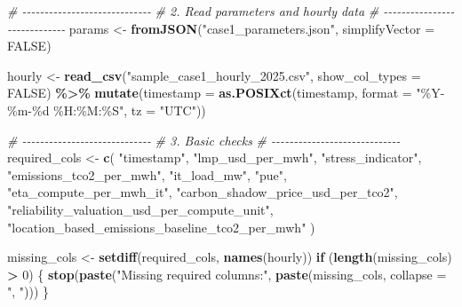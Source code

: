 \documentclass[
]{article}
\newenvironment{Shaded}{\begin{snugshade}}{\end{snugshade}}
\newcommand{\AttributeTok}[1]{\textcolor[rgb]{0.13,0.29,0.53}{#1}}
\newcommand{\CommentTok}[1]{\textcolor[rgb]{0.56,0.35,0.01}{\textit{#1}}}
\newcommand{\ConstantTok}[1]{\textcolor[rgb]{0.56,0.35,0.01}{#1}}
\newcommand{\ControlFlowTok}[1]{\textcolor[rgb]{0.13,0.29,0.53}{\textbf{#1}}}
\newcommand{\DecValTok}[1]{\textcolor[rgb]{0.00,0.00,0.81}{#1}}
\newcommand{\FunctionTok}[1]{\textcolor[rgb]{0.13,0.29,0.53}{\textbf{#1}}}
\newcommand{\NormalTok}[1]{#1}
\newcommand{\OtherTok}[1]{\textcolor[rgb]{0.56,0.35,0.01}{#1}}
\newcommand{\SpecialCharTok}[1]{\textcolor[rgb]{0.81,0.36,0.00}{\textbf{#1}}}
\newcommand{\StringTok}[1]{\textcolor[rgb]{0.31,0.60,0.02}{#1}}
\begin{document}
\begin{Shaded}
\begin{Highlighting}[]
\CommentTok{\# {-}{-}{-}{-}{-}{-}{-}{-}{-}{-}{-}{-}{-}{-}{-}{-}{-}{-}{-}{-}{-}{-}{-}{-}{-}{-}{-}{-}{-}}
\CommentTok{\# 2. Read parameters and hourly data}
\CommentTok{\# {-}{-}{-}{-}{-}{-}{-}{-}{-}{-}{-}{-}{-}{-}{-}{-}{-}{-}{-}{-}{-}{-}{-}{-}{-}{-}{-}{-}{-}}
\NormalTok{params }\OtherTok{\textless{}{-}} \FunctionTok{fromJSON}\NormalTok{(}\StringTok{"case1\_parameters.json"}\NormalTok{, }\AttributeTok{simplifyVector =} \ConstantTok{FALSE}\NormalTok{)}

\NormalTok{hourly }\OtherTok{\textless{}{-}} \FunctionTok{read\_csv}\NormalTok{(}\StringTok{"sample\_case1\_hourly\_2025.csv"}\NormalTok{, }\AttributeTok{show\_col\_types =} \ConstantTok{FALSE}\NormalTok{) }\SpecialCharTok{\%\textgreater{}\%}
  \FunctionTok{mutate}\NormalTok{(}\AttributeTok{timestamp =} \FunctionTok{as.POSIXct}\NormalTok{(timestamp, }\AttributeTok{format =} \StringTok{"\%Y{-}\%m{-}\%d \%H:\%M:\%S"}\NormalTok{, }\AttributeTok{tz =} \StringTok{"UTC"}\NormalTok{))}

\CommentTok{\# {-}{-}{-}{-}{-}{-}{-}{-}{-}{-}{-}{-}{-}{-}{-}{-}{-}{-}{-}{-}{-}{-}{-}{-}{-}{-}{-}{-}{-}}
\CommentTok{\# 3. Basic checks}
\CommentTok{\# {-}{-}{-}{-}{-}{-}{-}{-}{-}{-}{-}{-}{-}{-}{-}{-}{-}{-}{-}{-}{-}{-}{-}{-}{-}{-}{-}{-}{-}}
\NormalTok{required\_cols }\OtherTok{\textless{}{-}} \FunctionTok{c}\NormalTok{(}
  \StringTok{"timestamp"}\NormalTok{,}
  \StringTok{"lmp\_usd\_per\_mwh"}\NormalTok{,}
  \StringTok{"stress\_indicator"}\NormalTok{,}
  \StringTok{"emissions\_tco2\_per\_mwh"}\NormalTok{,}
  \StringTok{"it\_load\_mw"}\NormalTok{,}
  \StringTok{"pue"}\NormalTok{,}
  \StringTok{"eta\_compute\_per\_mwh\_it"}\NormalTok{,}
  \StringTok{"carbon\_shadow\_price\_usd\_per\_tco2"}\NormalTok{,}
  \StringTok{"reliability\_valuation\_usd\_per\_compute\_unit"}\NormalTok{,}
  \StringTok{"location\_based\_emissions\_baseline\_tco2\_per\_mwh"}
\NormalTok{)}

\NormalTok{missing\_cols }\OtherTok{\textless{}{-}} \FunctionTok{setdiff}\NormalTok{(required\_cols, }\FunctionTok{names}\NormalTok{(hourly))}
\ControlFlowTok{if}\NormalTok{ (}\FunctionTok{length}\NormalTok{(missing\_cols) }\SpecialCharTok{\textgreater{}} \DecValTok{0}\NormalTok{) \{}
  \FunctionTok{stop}\NormalTok{(}\FunctionTok{paste}\NormalTok{(}\StringTok{"Missing required columns:"}\NormalTok{, }\FunctionTok{paste}\NormalTok{(missing\_cols, }\AttributeTok{collapse =} \StringTok{", "}\NormalTok{)))}
\NormalTok{\}}


\end{Highlighting}
\end{Shaded}
\end{document}
